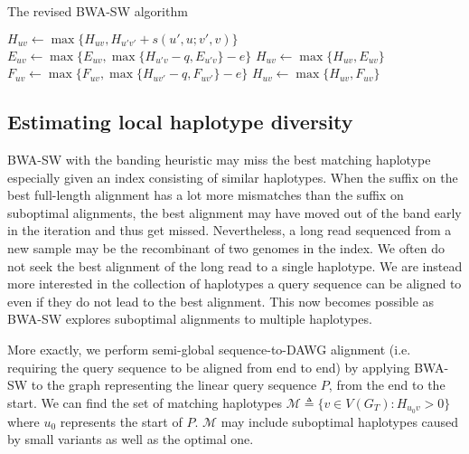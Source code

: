 \documentclass[webpdf,contemporary,large,namedate]{oup-authoring-template}%
\begin{document}
\begin{algorithm}[tb]
	\caption{The revised BWA-SW algorithm}\label{algo:bwa-sw}
	\begin{algorithmic}[1]
							\State $H_{uv}\gets \max\{H_{uv},H_{u'v'}+s(u',u;v',v)\}$
						\EndFor
					\EndFor
						\State $E_{uv}\gets\max\{E_{uv},\max\{H_{u'v}-q,E_{u'v}\}-e\}$
						\State $H_{uv}\gets\max\{H_{uv},E_{uv}\}$
					\EndFor
				\EndFor
						\State $F_{uv}\gets\max\{F_{uv},\max\{H_{uv'}-q,F_{uv'}\}-e\}$
						\State $H_{uv}\gets\max\{H_{uv},F_{uv}\}$
					\EndFor
				\EndFor
			\EndFor
		\EndProcedure
	\end{algorithmic}
\end{algorithm}

\subsection{Estimating local haplotype diversity}

BWA-SW with the banding heuristic may miss the best matching haplotype especially given an index consisting of similar haplotypes.
When the suffix on the best full-length alignment has a lot more mismatches than the suffix on suboptimal alignments,
the best alignment may have moved out of the band early in the iteration and thus get missed.
Nevertheless, a long read sequenced from a new sample may be the recombinant of two genomes in the index.
We often do not seek the best alignment of the long read to a single haplotype.
We are instead more interested in the collection of haplotypes a query sequence can be aligned to even if they do not lead to the best alignment.
This now becomes possible as BWA-SW explores suboptimal alignments to multiple haplotypes.

More exactly, we perform semi-global sequence-to-DAWG alignment (i.e. requiring the query sequence to be aligned from end to end)
by applying BWA-SW to the graph representing the linear query sequence $P$, from the end to the start.
We can find the set of matching haplotypes $\mathcal{M}\triangleq\{v\in V(G_T):H_{u_0v}>0\}$ where $u_0$ represents the start of $P$.
$\mathcal{M}$ may include suboptimal haplotypes caused by small variants as well as the optimal one.
\end{document}
